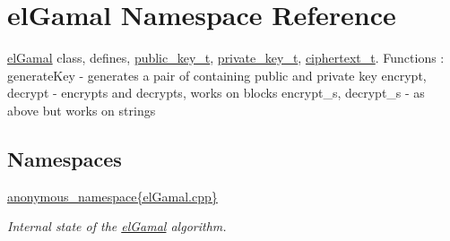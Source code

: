 \hypertarget{namespaceelGamal}{}\section{el\+Gamal Namespace Reference}
\label{namespaceelGamal}


\mbox{\hyperlink{namespaceelGamal}{el\+Gamal}} class, defines, \mbox{\hyperlink{structelGamal_1_1public__key__t}{public\+\_\+key\+\_\+t}}, \mbox{\hyperlink{structelGamal_1_1private__key__t}{private\+\_\+key\+\_\+t}}, \mbox{\hyperlink{structelGamal_1_1ciphertext__t}{ciphertext\+\_\+t}}. Functions \+: generate\+Key -\/ generates a pair of containing public and private key encrypt, decrypt -\/ encrypts and decrypts, works on blocks encrypt\+\_\+s, decrypt\+\_\+s -\/ as above but works on strings  


\subsection*{Namespaces}
\begin{DoxyCompactItemize}
\item 
 \mbox{\hyperlink{namespaceelGamal_1_1anonymous__namespace_02elGamal_8cpp_03}{anonymous\+\_\+namespace\{el\+Gamal.\+cpp\}}}
\begin{DoxyCompactList}\small\item\em Internal state of the \mbox{\hyperlink{namespaceelGamal}{el\+Gamal}} algorithm. \end{DoxyCompactList}\end{DoxyCompactItemize}
